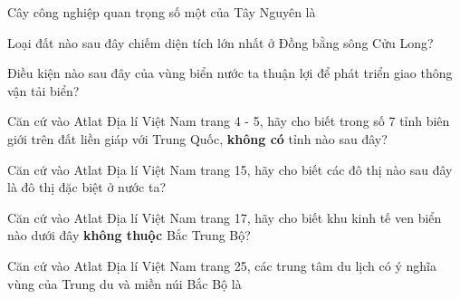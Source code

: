 \documentclass[11pt]{article}
\begin{document}
\begin{vnmultiplechoice}[ rearrange=yes, keycolumns=3]
\begin{question} %
Cây công nghiệp quan trọng số một của Tây Nguyên là
\datcot
\bonpa
{}
{}
{}
{}
\end{question}

\begin{question} %
Loại đất nào sau đây chiếm diện tích lớn nhất ở Đồng bằng sông Cửu Long?
\datcot
\bonpa
{}
{}
{}
{}
\end{question}

\begin{question} %
Điều kiện nào sau đây của vùng biển nước ta thuận lợi để phát triển giao thông vận tải biển?
\datcot[4]
\bonpa
{}
{}
{}
{}
\end{question}
\begin{question} %
Căn cứ vào Atlat Địa lí Việt Nam trang 4 - 5, hãy cho biết trong số 7 tỉnh biên giới trên đất liền
giáp với Trung Quốc, \textbf{không có} tỉnh nào sau đây?
\datcot
\bonpa
{}
{}
{}
{}
\end{question}

\begin{question} %
Căn cứ vào Atlat Địa lí Việt Nam trang 15, hãy cho biết các đô thị nào sau đây là đô thị đặc biệt
ở nước ta?
\datcot
\bonpa
{}
{}
{}
{}
\end{question}

\begin{question} %
Căn cứ vào Atlat Địa lí Việt Nam trang 17, hãy cho biết khu kinh tế ven biển nào dưới đây
\textbf{không thuộc} Bắc Trung Bộ?
\datcot
\bonpa
{}
{}
{}
{}
\end{question}

\begin{question} %
Căn cứ vào Atlat Địa lí Việt Nam trang 25, các trung tâm du lịch có ý nghĩa vùng của Trung du
và miền núi Bắc Bộ là
\datcot
\bonpa
{}
{}
{}
{}
\end{question}


\end{vnmultiplechoice}
\end{document}
